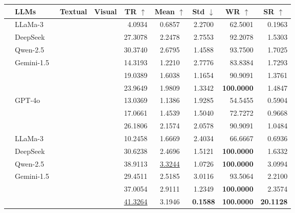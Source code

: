\begin{table*}
	\centering
	\footnotesize
	\setlength{\tabcolsep}{8pt}
	\begin{tabular}{clccrccrr}
	\toprule[1.1pt]
	& LLMs & Textual & Visual & \multicolumn{1}{c}{TR $\uparrow$} & Mean $\uparrow$ & Std $\downarrow$ & \multicolumn{1}{c}{WR $\uparrow$} & \multicolumn{1}{c}{SR $\uparrow$} \\
	\midrule
	\multirow{9}[4]{*}{\rotatebox{90}{\textit{w/o} Reflection}} 
	& {LLaMa-3~\citep{LLaMa3}} & \CIRCLE & \Circle & 4.0934 & 0.6857 & 2.2700 & 62.5001 & 0.1963 \\
	& {DeepSeek~\citep{DeepSeek3v}} & \CIRCLE & \Circle & 27.3078 & 2.2478 & 2.7553 & 92.2078 & 1.5303 \\
	& {Qwen-2.5~\citep{qwen2.5}} & \CIRCLE & \Circle & 30.3740 & 2.6795 & 1.4588 & 93.7500 & 1.7025 \\
	\cmidrule(l){2-9}
	& \multirow{3}{*}{Gemini-1.5~\citep{Gemini1.5}} & \CIRCLE & \Circle & 14.3193 & 1.2210 & 2.7776 & 83.8384 & 1.7293 \\
	& & \Circle & \CIRCLE & 19.0389 & 1.6038 & 1.1654 & 90.9091 & 1.3761 \\
	& & \CIRCLE & \CIRCLE & 23.9649 & 1.9809 & 1.3342 & \textbf{100.0000} & 1.4847 \\
	\cmidrule(l){3-9}
	& \multirow{3}{*}{GPT-4o~\citep{GPT4o}} & \CIRCLE & \Circle & 13.0369 & 1.1386 & 1.9285 & 54.5455 & 0.5904 \\
	& & \Circle & \CIRCLE & 17.0661 & 1.4539 & 1.5040 & 72.7272 & 0.9668 \\
	& & \CIRCLE & \CIRCLE & 26.1806 & 2.1574 & 2.0578 & 90.9091 & 1.0484 \\
	\midrule
	\multirow{9}[4]{*}{\rotatebox{90}{\textit{w/} Reflection}} 
	& {LLaMa-3~\citep{LLaMa3}} & \CIRCLE & \Circle & 10.2458 & 1.6669 & 2.4034 & 66.6667 & 0.6936 \\
	& {DeepSeek~\citep{DeepSeek3v}} & \CIRCLE & \Circle & 30.6238 & 2.4696 & 1.5121 & \textbf{100.0000} & 1.6332 \\
	& {Qwen-2.5~\citep{qwen2.5}} & \CIRCLE & \Circle & 38.9113 & \underline{3.3244} & 1.0726 & \textbf{100.0000} & 3.0994 \\
	\cmidrule(l){2-9}
	& \multirow{3}{*}{Gemini-1.5~\citep{Gemini1.5}} & \CIRCLE & \Circle & 29.4511 & 2.5185 & 3.0116 & 93.5064 & 2.2100 \\
	& & \Circle & \CIRCLE & 37.0054 & 2.9111 & 1.2349 & \textbf{100.0000} & 2.3574 \\
	& & \CIRCLE & \CIRCLE & \underline{41.3264} & 3.1946 & \textbf{0.1588} & \textbf{100.0000} & \textbf{20.1128} \\

\end{tabular}
\end{table*}
